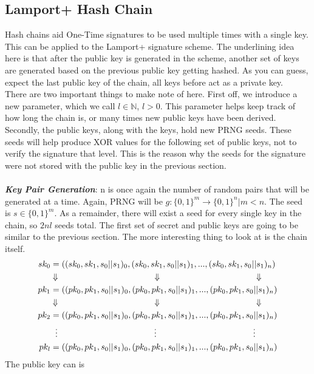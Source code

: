 \documentclass[]{scrartcl}
\makeatletter
\newcommand{\mathcenter}{\@fleqnfalse}
\makeatother
\begin{document}
\subsection*{Lamport+ Hash Chain}
Hash chains aid One-Time signatures to be used multiple times with a single key. This can be applied to the Lamport+ signature scheme. The underlining idea here is that after the public key is generated in the scheme, another set of keys are generated based on the previous public key getting hashed. As you can guess, expect the last public key of the chain, all keys before act as a private key.\\
There are two important things to make note of here. First off, we introduce a new parameter, which we call $l \in \mathbb{N}$, $l > 0$. This parameter helps keep track of how long the chain is, or many times new public keys have been derived. Secondly, the public keys, along with the keys, hold new PRNG seeds. These seeds will help produce XOR values for the following set of public keys, not to verify the signature that level. This is the reason why the seeds for the signature were not stored with the public key in the previous section.\\ \\
\textbf{\textit{Key Pair Generation}}: n is once again the number of random pairs that will be generated at a time. Again, PRNG will be $g : \{0,1\}^m \rightarrow \{0,1\}^n | m < n$. The seed is $s \in \{0,1\}^m$. As a remainder, there will exist a seed for every single key in the chain, so $2nl$ seeds total. The first set of secret and public keys are going to be similar to the previous section. The more interesting thing to look at is the chain itself.
\mathcenter
\begin{equation}
\begin{split}
sk_0 & = ((sk_0, sk_1, s_0||s_1)_0,(sk_0, sk_1, s_0||s_1)_1,...,(sk_0, sk_1, s_0||s_1)_n)\\
& \Downarrow \hspace{4cm}\Downarrow \hspace{4cm}\Downarrow \\
pk_1 & = ((pk_0, pk_1, s_0||s_1)_0,(pk_0, pk_1, s_0||s_1)_1,...,(pk_0, pk_1, s_0||s_1)_n) \\
& \Downarrow \hspace{4cm}\Downarrow \hspace{4cm}\Downarrow \\
pk_2 & = ((pk_0, pk_1, s_0||s_1)_0,(pk_0, pk_1, s_0||s_1)_1,...,(pk_0, pk_1, s_0||s_1)_n) \\
& \hspace{0.2cm}\vdots \hspace{4cm}\vdots \hspace{4cm}\vdots \\
pk_l & = ((pk_0, pk_1, s_0||s_1)_0,(pk_0, pk_1, s_0||s_1)_1,...,(pk_0, pk_1, s_0||s_1)_n) \\
\end{split}
\end{equation}
The public key can is
\end{document}
